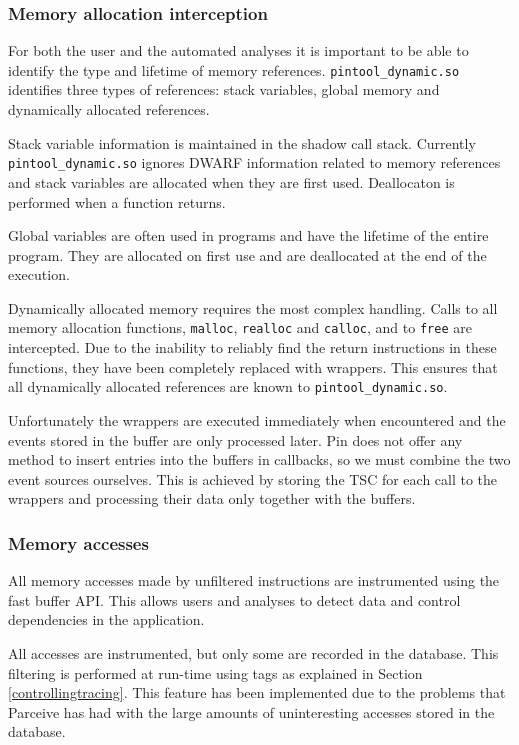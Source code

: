 \subsubsection{Memory allocation interception}

For both the user and the automated analyses it is important to be able to identify the type and lifetime of memory references. \texttt{pintool\_dynamic.so} identifies three types of references: stack variables, global memory and dynamically allocated references.

Stack variable information is maintained in the shadow call stack. Currently \texttt{pintool\_dynamic.so} ignores DWARF information related to memory references and stack variables are allocated when they are first used. Deallocaton is performed when a function returns.

Global variables are often used in programs and have the lifetime of the entire program. They are allocated on first use and are deallocated at the end of the execution.

Dynamically allocated memory requires the most complex handling. Calls to all memory allocation functions, \texttt{malloc}, \texttt{realloc} and \texttt{calloc}, and to \texttt{free} are intercepted. Due to the inability to reliably find the return instructions in these functions, they have been completely replaced with wrappers. This ensures that all dynamically allocated references are known to \texttt{pintool\_dynamic.so}.

Unfortunately the wrappers are executed immediately when encountered and the events stored in the buffer are only processed later. Pin does not offer any method to insert entries into the buffers in callbacks, so we must combine the two event sources ourselves. This is achieved by storing the TSC for each call to the wrappers and processing their data only together with the buffers. 

\subsubsection{Memory accesses}

All memory accesses made by unfiltered instructions are instrumented using the fast buffer API. This allows users and analyses to detect data and control dependencies in the application.

All accesses are instrumented, but only some are recorded in the database. This filtering is performed at run-time using tags as explained in Section \ref{controllingtracing}. This feature has been implemented due to the problems that Parceive \cite{parceive} has had with the large amounts of uninteresting accesses stored in the database.


